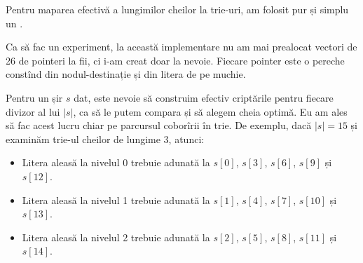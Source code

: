 \documentclass[../main.tex]{subfiles}
\begin{document}
Pentru maparea efectivă a lungimilor cheilor la trie-uri, am folosit pur și simplu un .

Ca să fac un experiment, la această implementare nu am mai prealocat vectori de 26 de pointeri la fii, ci i-am creat doar la nevoie. Fiecare pointer este o pereche constînd din nodul-destinație și din litera de pe muchie.

Pentru un șir $s$ dat, este nevoie să construim efectiv criptările pentru fiecare divizor al lui $|s|$, ca să le putem compara și să alegem cheia optimă. Eu am ales să fac acest lucru chiar pe parcursul coborîrii în trie. De exemplu, dacă $|s| = 15$ și examinăm trie-ul cheilor de lungime 3, atunci:

\begin{itemize}
  \item Litera aleasă la nivelul 0 trebuie adunată la $s[0]$, $s[3]$, $s[6]$, $s[9]$ și $s[12]$.
  \item Litera aleasă la nivelul 1 trebuie adunată la $s[1]$, $s[4]$, $s[7]$, $s[10]$ și $s[13]$.
  \item Litera aleasă la nivelul 2 trebuie adunată la $s[2]$, $s[5]$, $s[8]$, $s[11]$ și $s[14]$.
\end{itemize}
\end{document}
